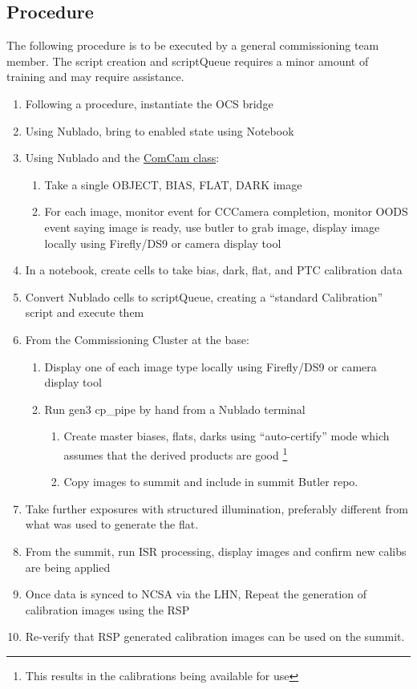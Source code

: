 \subsection{Procedure}
The following procedure is to be executed by a general commissioning team member. The script creation and scriptQueue requires a minor amount of training and may require assistance.
\begin{enumerate}
	\item Following a procedure, instantiate the OCS bridge
	\item Using Nublado, bring to enabled state using Notebook
	\item Using Nublado and the \href{https://ts-observatory-control.lsst.io/py-api/lsst.ts.observatory.control.maintel.ComCam.html}{ComCam class}:
	\begin{enumerate}
 		\item Take a single OBJECT, BIAS, FLAT, DARK image
 		\item For each image, monitor event for CCCamera completion, monitor \gls{OODS} event saying image is ready, use butler to grab image, display image locally using Firefly/DS9 or camera display tool
    \end{enumerate}	
	\item In a notebook, create cells to take bias, dark, flat, and PTC calibration data
	\item Convert Nublado cells to \gls{scriptQueue}, creating a ``standard Calibration'' script and execute them
	\item From the Commissioning Cluster at the base:
	\begin{enumerate}
		\item Display one of each image type locally using Firefly/DS9 or camera display tool
		\item Run gen3 \gls{cp_pipe} by hand from a Nublado terminal
    	\begin{enumerate}
    		\item Create master biases, flats, darks using ``auto-certify'' mode which assumes that the derived products are good \footnote{This results in the calibrations being available for use}
    		\item Copy images to summit and include in summit Butler repo.
    	\end{enumerate}
  	\end{enumerate}
 	\item Take further exposures with structured illumination, preferably different from what was used to generate the flat.
  	\item From the summit, run \gls{ISR} processing, display images and confirm new calibs are being applied
	\item Once data is synced to NCSA via the \gls{LHN}, Repeat the generation of calibration images using the \gls{RSP}
	\item Re-verify that \gls{RSP} generated calibration images can be used on the summit.
\end{enumerate}

